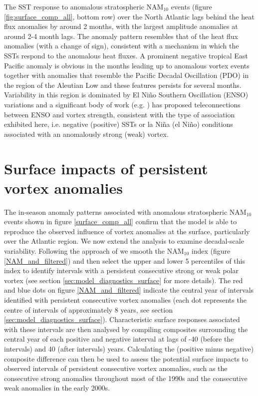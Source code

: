 The SST response to anomalous stratospheric NAM$_{10}$ events (figure \ref{fig:surface_comp_all}, bottom row) over the North Atlantic lags behind the heat flux anomalies by around 2 months, with the largest amplitude anomalies at around 2-4 month lags. The anomaly pattern resembles that of the heat flux anomalies (with a change of sign), consistent with a mechanism in which the SSTs respond to the anomalous heat fluxes. A prominent negative tropical East Pacific anomaly is obvious in the months leading up to anomalous vortex events together with  anomalies that resemble the Pacific Decadal Oscillation (PDO) in the region of the Aleutian Low \citep{mantuaPacific1997a} and these features persists for several months. Variability in this region is dominated by El Ni\~{n}o Southern Oscillation (ENSO) variations and a significant body of work (e.g. \cite{domeisenTeleconnection2019d}) has proposed teleconnections between ENSO and vortex strength, consistent with the type of association exhibited here, i.e. negative (positive) SSTs or la Ni\~{n}a (el Ni\~{n}o) conditions associated with an anomalously strong (weak) vortex. 


\section{Surface impacts of persistent vortex anomalies}
\label{persistent}
The in-season anomaly patterns associated with anomalous stratospheric NAM$_{10}$ events shown in figure \ref{surface_comp_all} confirm that the model is able to reproduce the observed influence of vortex anomalies at the surface, particularly over the Atlantic region. We now extend the analysis to examine decadal-scale variability. Following the approach of \cite{reichlerStratospheric2012b} we smooth the NAM$_{10}$ index  (figure \ref{NAM_and_filtered}) and then select the upper and lower 5 percentiles of this index to identify intervals with a persistent consecutive strong or weak polar vortex (see section \ref{sec:model_diagnostics_surface} for more details). The red and blue dots on figure \ref{NAM_and_filtered} indicate the central year of intervals identified with persistent consecutive vortex anomalies (each dot represents the centre of intervals of approximately 8 years, see section \ref{sec:model_diagnostics_surface}). Characteristic surface responses associated with these intervals are then analysed by compiling composites surrounding the central year of each positive and negative interval at lags of -40 (before the intervals) and 40 (after intervals) years. Calculating the (positive minus negative) composite difference can then be used to assess the potential surface impacts to observed intervals of persistent consecutive vortex anomalies, such as the consecutive strong anomalies throughout most of the 1990s and the consecutive weak anomalies in the early 2000s. 
 

